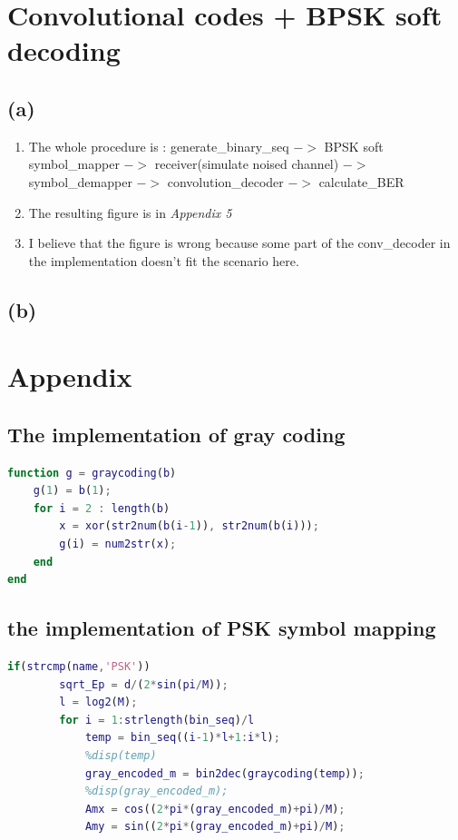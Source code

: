 \documentclass{article}
\begin{document}
\begin{CJK*}{UTF8}{bsmi}
\section{Convolutional codes + BPSK soft decoding}
\subsection{(a)}
\begin{enumerate}
    \item The whole procedure is : generate\_binary\_seq $->$ BPSK soft symbol\_mapper $->$ receiver(simulate noised channel) $->$ symbol\_demapper $->$ convolution\_decoder $->$ calculate\_BER
    \item The resulting figure is in \emph{Appendix 5}
    \item I believe that the figure is wrong because some part of the conv\_decoder in the implementation doesn't fit the scenario here.
\end{enumerate}

\subsection{(b)}

\section{Appendix}
\subsection{The implementation of gray coding}
\begin{lstlisting}[language = Matlab]
%% gray code function
function g = graycoding(b)
    g(1) = b(1);
    for i = 2 : length(b)
        x = xor(str2num(b(i-1)), str2num(b(i)));
        g(i) = num2str(x);
    end
end
\end{lstlisting}
\subsection{the implementation of PSK symbol mapping}
\begin{lstlisting}[language = Matlab]
    if(strcmp(name,'PSK'))
        sqrt_Ep = d/(2*sin(pi/M));
        l = log2(M);
        for i = 1:strlength(bin_seq)/l
            temp = bin_seq((i-1)*l+1:i*l);
            %disp(temp)
            gray_encoded_m = bin2dec(graycoding(temp));
            %disp(gray_encoded_m);
            Amx = cos((2*pi*(gray_encoded_m)+pi)/M);
            Amy = sin((2*pi*(gray_encoded_m)+pi)/M);
            

\end{lstlisting}
\end{CJK*}
\end{document}
